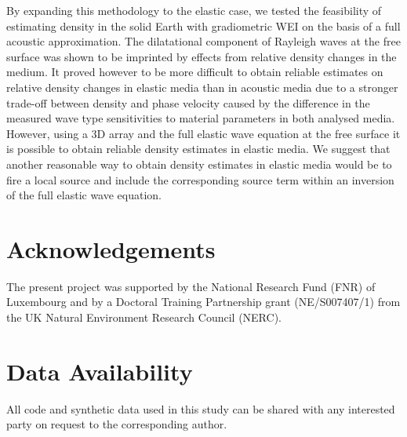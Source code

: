 \documentclass[]{article}
\begin{document}
	By expanding this methodology to the elastic case, we tested the feasibility of estimating density in the solid Earth with gradiometric WEI on the basis of a full acoustic approximation. The dilatational component of Rayleigh waves at the free surface was shown to be imprinted by effects from relative density changes in the medium. It proved however to be more difficult to obtain reliable estimates on relative density changes in elastic media than in acoustic media due to a stronger trade-off between density and phase velocity caused by the difference in the measured wave type sensitivities to material parameters in both analysed media. However, using a 3D array and the full elastic wave equation at the free surface it is possible to obtain reliable density estimates in elastic media. We suggest that another reasonable way to obtain density estimates in elastic media would be to fire a local source and include the corresponding source term within an inversion of the full elastic wave equation.
	

	\section*{Acknowledgements}
	 
	The present project was supported by the National Research Fund (FNR) of Luxembourg and by a Doctoral Training Partnership grant (NE/S007407/1) from the UK Natural Environment Research Council (NERC).
	 
	\section*{Data Availability} 
	\hypersetup{
		colorlinks=true,
		linkcolor=blue,      
		urlcolor=cyan,
	}
	
	All code and synthetic data used in this study can be shared with any interested party on request to the corresponding author.
	
\end{document}
